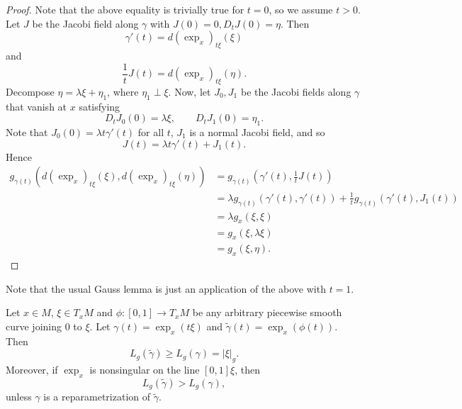 \begin{proof}
Note that the above equality is trivially true for $t=0$, so we assume $t>0$. Let $J$ be the Jacobi field along $\gamma$ with $J(0)=0, D_tJ(0)=\eta$.  Then
$$\gamma'(t)=d(\exp_x)_{t\xi}(\xi)$$
and
$$\frac{1}{t}J(t)=d(\exp_x)_{t\xi}(\eta).$$
Decompose $\eta=\lambda\xi+\eta_1$, where $\eta_1\perp\xi$.  Now, let $J_0, J_1$ be the Jacobi fields along $\gamma$ that vanish at $x$ satisfying
$$D_tJ_0(0)=\lambda\xi,\qquad D_tJ_1(0)=\eta_1.$$
Note that $J_0(0)=\lambda t\gamma'(t)$ for all $t$, $J_1$ is a normal Jacobi field, and so
$$J(t)=\lambda t\gamma'(t)+J_1(t).$$
Hence
\begin{align*}
	g_{\gamma(t)}(d(\exp_x)_{t\xi}(\xi),d(\exp_x)_{t\xi}(\eta))&=g_{\gamma(t)}\left(\gamma'(t),\frac{1}{t}J(t)\right)\\
	&=\lambda g_{\gamma(t)}(\gamma'(t),\gamma'(t))+\frac{1}{t}g_{\gamma(t)}(\gamma'(t),J_1(t))\\
	&=\lambda g_x(\xi,\xi)\\
	&=g_x(\xi,\lambda\xi)\\
	&=g_x(\xi,\eta).
\end{align*}
\end{proof}

Note that the usual Gauss lemma is just an application of the above with $t=1$.

\begin{prop}\label{thm:paramProp}
    Let $x\in M$, $\xi\in T_xM$ and $\phi:[0,1]\to T_xM$ be any arbitrary piecewise smooth curve joining $0$ to $\xi$.  Let $\gamma(t)=\exp_x(t\xi)$ and $\tilde{\gamma}(t)=\exp_x(\phi(t))$.  Then
    $$L_g(\tilde{\gamma})\geq L_g(\gamma)=|\xi|_g.$$
    Moreover, if $\exp_x$ is nonsingular on the line $[0,1]\xi$, then
    $$L_g(\tilde{\gamma})>L_g(\gamma),$$
    unless $\gamma$ is a reparametrization of $\tilde{\gamma}$.
\end{prop}

